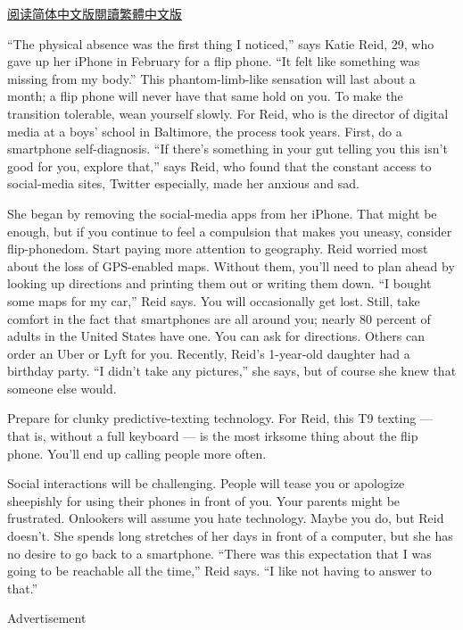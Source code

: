 \href{https://cn.nytimes3xbfgragh.onion/style/20180727/how-to-go-back-to-a-flip-phone/}{阅读简体中文版}\href{https://cn.nytimes3xbfgragh.onion/style/20180727/how-to-go-back-to-a-flip-phone/zh-hant/}{閱讀繁體中文版}

``The physical absence was the first thing I noticed,'' says Katie Reid,
29, who gave up her iPhone in February for a flip phone. ``It felt like
something was missing from my body.'' This phantom-limb-like sensation
will last about a month; a flip phone will never have that same hold on
you. To make the transition tolerable, wean yourself slowly. For Reid,
who is the director of digital media at a boys' school in Baltimore, the
process took years. First, do a smartphone self-diagnosis. ``If there's
something in your gut telling you this isn't good for you, explore
that,'' says Reid, who found that the constant access to social-media
sites, Twitter especially, made her anxious and sad.

She began by removing the social-media apps from her iPhone. That might
be enough, but if you continue to feel a compulsion that makes you
uneasy, consider flip-phonedom. Start paying more attention to
geography. Reid worried most about the loss of GPS-enabled maps. Without
them, you'll need to plan ahead by looking up directions and printing
them out or writing them down. ``I bought some maps for my car,'' Reid
says. You will occasionally get lost. Still, take comfort in the fact
that smartphones are all around you; nearly 80 percent of adults in the
United States have one. You can ask for directions. Others can order an
Uber or Lyft for you. Recently, Reid's 1-year-old daughter had a
birthday party. ``I didn't take any pictures,'' she says, but of course
she knew that someone else would.

Prepare for clunky predictive-texting technology. For Reid, this T9
texting --- that is, without a full keyboard --- is the most irksome
thing about the flip phone. You'll end up calling people more often.

Social interactions will be challenging. People will tease you or
apologize sheepishly for using their phones in front of you. Your
parents might be frustrated. Onlookers will assume you hate technology.
Maybe you do, but Reid doesn't. She spends long stretches of her days in
front of a computer, but she has no desire to go back to a smartphone.
``There was this expectation that I was going to be reachable all the
time,'' Reid says. ``I like not having to answer to that.''

Advertisement

